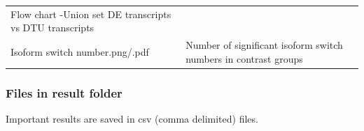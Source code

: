 \documentclass[]{article}
\begin{document}
\begin{longtable}[]{@{}ll@{}}
\begin{minipage}[t]{0.43\columnwidth}
Flow chart -Union set DE transcripts vs DTU transcripts\strut
\end{minipage}\tabularnewline
\begin{minipage}[t]{0.51\columnwidth}\raggedright\strut
Isoform switch number.png/.pdf\strut
\end{minipage} & \begin{minipage}[t]{0.43\columnwidth}\raggedright\strut
Number of significant isoform switch numbers in contrast groups\strut
\end{minipage}\tabularnewline
\bottomrule
\end{longtable}

\subsubsection{Files in result folder}\label{files-in-result-folder}

Important results are saved in csv (comma delimited) files.
\end{document}
